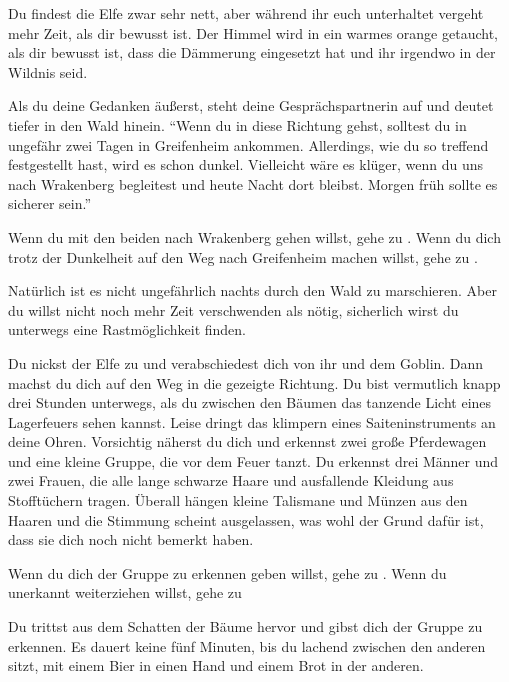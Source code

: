 Du findest die Elfe zwar sehr nett, aber während ihr euch unterhaltet vergeht mehr Zeit, als dir bewusst ist. Der Himmel wird in ein warmes orange getaucht, als dir bewusst ist, dass die Dämmerung eingesetzt hat und ihr irgendwo in der Wildnis seid.

Als du deine Gedanken äußerst, steht deine Gesprächspartnerin auf und deutet tiefer in den Wald hinein. ``Wenn du in diese Richtung gehst, solltest du in ungefähr zwei Tagen in Greifenheim ankommen. Allerdings, wie du so treffend festgestellt hast, wird es schon dunkel. Vielleicht wäre es klüger, wenn du uns nach Wrakenberg begleitest und heute Nacht dort bleibst. Morgen früh sollte es sicherer sein.''

Wenn du mit den beiden nach Wrakenberg gehen willst, gehe zu . Wenn du dich trotz der Dunkelheit auf den Weg nach Greifenheim machen willst, gehe zu .


Natürlich ist es nicht ungefährlich nachts durch den Wald zu marschieren. Aber du willst nicht noch mehr Zeit verschwenden als nötig, sicherlich wirst du unterwegs eine Rastmöglichkeit finden.

Du nickst der Elfe zu und verabschiedest dich von ihr und dem Goblin. Dann machst du dich auf den Weg in die gezeigte Richtung. Du bist vermutlich knapp drei Stunden unterwegs, als du zwischen den Bäumen das tanzende Licht eines Lagerfeuers sehen kannst. Leise dringt das klimpern eines Saiteninstruments an deine Ohren. Vorsichtig näherst du dich und erkennst zwei große Pferdewagen und eine kleine Gruppe, die vor dem Feuer tanzt. Du erkennst drei Männer und zwei Frauen, die alle lange schwarze Haare und ausfallende Kleidung aus Stofftüchern tragen. Überall hängen kleine Talismane und Münzen aus den Haaren und die Stimmung scheint ausgelassen, was wohl der Grund dafür ist, dass sie dich noch nicht bemerkt haben.

Wenn du dich der Gruppe zu erkennen geben willst, gehe zu .
Wenn du unerkannt weiterziehen willst, gehe zu 


Du trittst aus dem Schatten der Bäume hervor und gibst dich der Gruppe zu erkennen. Es dauert keine fünf Minuten, bis du lachend zwischen den anderen sitzt, mit einem Bier in einen Hand und einem Brot in der anderen.

